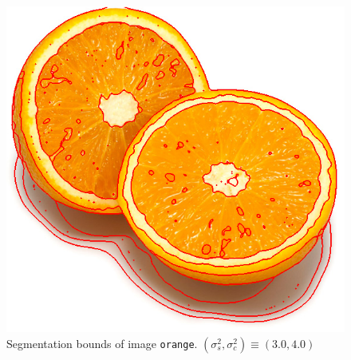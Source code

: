 {\begin{minipage}{\linewidth}
\begin{minipage}{0.45\linewidth}
\begin{figure}[H]
      \includegraphics[scale=0.4]{./images/02/orange/meanshift2_3_4.png}
      \caption{Segmentation bounds of image \texttt{orange}.
        $(\sigma_s^2, \sigma_c^2) \equiv (3.0, 4.0)$}
      \label{fig:02_orange2_3_4}
    \end{figure}
  \end{minipage}
\end{minipage}
}

